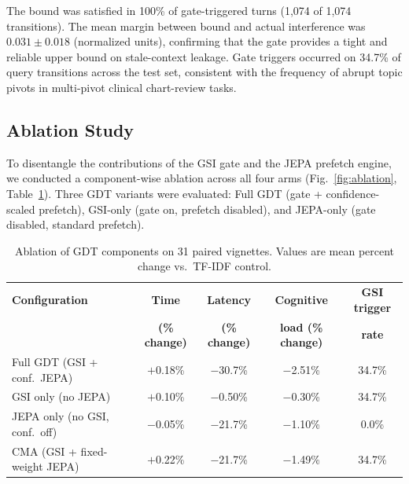 \documentclass[11pt]{article}
\begin{document}
The bound was satisfied in 100\% of gate-triggered turns (1,074 of 1,074 transitions). The mean margin between bound and actual interference was $0.031 \pm 0.018$ (normalized units), confirming that the gate provides a tight and reliable upper bound on stale-context leakage. Gate triggers occurred on 34.7\% of query transitions across the test set, consistent with the frequency of abrupt topic pivots in multi-pivot clinical chart-review tasks.

\subsection{Ablation Study}

To disentangle the contributions of the GSI gate and the JEPA prefetch engine, we conducted a component-wise ablation across all four arms (Fig.~\ref{fig:ablation}, Table~\ref{tab:ablation}). Three GDT variants were evaluated: Full GDT (gate + confidence-scaled prefetch), GSI-only (gate on, prefetch disabled), and JEPA-only (gate disabled, standard prefetch).

\begin{table}[htbp]
\centering
\caption{Ablation of GDT components on 31 paired vignettes. Values are mean percent change vs.\ TF-IDF control.}
\label{tab:ablation}
\begin{tabular}{lcccc}
\toprule
\textbf{Configuration} & \textbf{Time} & \textbf{Latency} & \textbf{Cognitive} & \textbf{GSI trigger} \\
 & \textbf{(\% change)} & \textbf{(\% change)} & \textbf{load (\% change)} & \textbf{rate} \\
\midrule
Full GDT (GSI + conf.\ JEPA) & $+$0.18\%  & $-$30.7\%  & $-$2.51\%  & 34.7\% \\
GSI only (no JEPA)            & $+$0.10\%  & $-$0.50\%  & $-$0.30\%  & 34.7\% \\
JEPA only (no GSI, conf.\ off)& $-$0.05\%  & $-$21.7\%  & $-$1.10\%  & 0.0\%  \\
CMA (GSI + fixed-weight JEPA) & $+$0.22\%  & $-$21.7\%  & $-$1.49\%  & 34.7\% \\
\bottomrule
\end{tabular}
\end{table}
\end{document}
